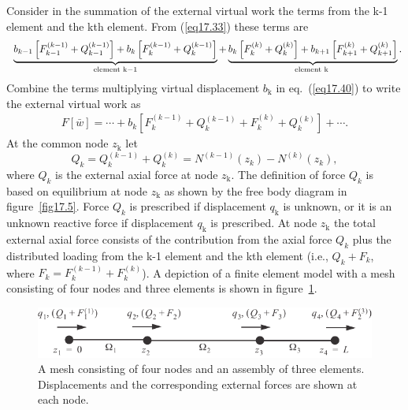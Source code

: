 \documentclass{AeroStructure-ERJohnson}
\begin{document}
\noindent Consider in the summation of the external virtual work the terms from the k-1 element and the kth element. From (\ref{eq17.33}) these terms are
\begin{align}\label{eq17.40}
\hspace*{6pt}\underbrace{b_{k-1}\left[F_{k-1}^{(k-1)}+Q_{k-1}^{(k-1)}\right]+b_{k}\left[F_{k}^{(k-1)}+Q_{k}^{(k-1)}\right]}_{\text {element } \mathrm{k}-1}+\underbrace{b_{k}\left[F_{k}^{(k)}+Q_{k}^{(k)}\right]+b_{k+1}\left[F_{k+1}^{(k)}+Q_{k+1}^{(k)}\right]}_{\text {element k }}.
\end{align}
Combine the terms multiplying virtual displacement $b_{\textrm{k}}$ in eq.~(\ref{eq17.40}) to write the external virtual work as
\begin{align}\label{eq17.41}
F[\bar{w}]=\cdots+b_{k}\left[F_{k}^{(k-1)}+Q_{k}^{(k-1)}+F_{k}^{(k)}+Q_{k}^{(k)}\right]+\cdots.
\end{align}
At the common node $z_{\textrm{k}}$ let
\begin{equation}
Q_{k}=Q_{k}^{(k-1)}+Q_{k}^{(k)}=N^{(k-1)}\left(z_{k}\right)-N^{(k)}\left(z_{k}\right), \label{eq17.42}
\end{equation}
where $Q_{k}$ is the external axial force at node $z_{\textrm{k}}$. The definition of force $Q_{k}$ is based on equilibrium at node $z_{\textrm{k}}$ as shown by the free body diagram in figure~\ref{fig17.5}. Force $Q_{k}$ is prescribed if displacement $q_{\textrm{k}}$ is unknown, or it is an unknown reactive force if displacement $q_{\textrm{k}}$ is prescribed. At node $z_{\textrm{k}}$ the total external axial force consists of the contribution from the axial force $Q_{k}$ plus the distributed loading from the k-1 element and the kth element (i.e., $Q_{k}+F_{k}$, where $F_{k}=F_{k}^{(k-1)}+F_{k}^{(k)}$). A depiction of a finite element model with a mesh consisting of four nodes and three elements is shown in figure~\ref{fig17.6}.

{\def\thefigure{17.5}
}


{\def\thefigure{17.6}
\begin{figure}[!h]
\centerline{\includegraphics{Figure_17-6.pdf}}
\caption{A mesh consisting of four nodes and an assembly of three elements. Displacements and the
corresponding external forces are shown at each node.}\label{fig17.6}
\end{figure}}
\end{document}
